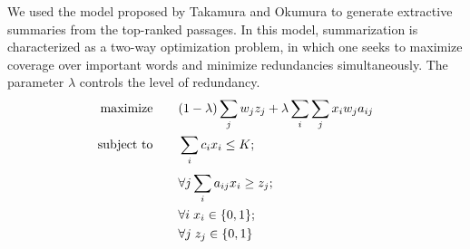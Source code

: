 \documentclass[a4paper,10pt,conference,compsocconf,final]{IEEEtran}
\begin{document}




We used the model proposed by Takamura and Okumura \cite{takamura2009text} to
generate extractive summaries from the top-ranked passages.  In this model,
summarization is characterized as a two-way optimization problem, in which one
seeks to maximize coverage over important words and minimize redundancies
simultaneously.  The parameter $\lambda$ controls the level of redundancy.
\begin{equation}
\begin{split}
  \textrm{maximize} \qquad & (1-\lambda) \sum_{j} w_j z_j + \lambda \sum_{i}\sum_{j} x_i w_j a_{ij} \\
  \textrm{subject to} \qquad & \sum_{i} c_ix_i \le K; \\
       & \forall j \sum_{i}^{} a_{ij}x_i \ge z_j; \\
       & \forall i \hspace{0.1cm} x_i \in \{0,1\}; \\
       & \forall j \hspace{0.1cm} z_j \in \{0,1\}
\end{split}
\end{equation}
	

	
\end{document}
